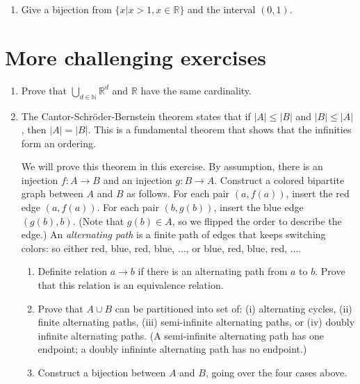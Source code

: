 \documentclass[11pt]{article}
\theoremstyle{definition}
\def\RR{\mathbb R}
\newcommand{\NN}{\mathbb{N}}
\begin{document}
\begin{enumerate}
    \item Give a bijection from $\{x | x > 1, x \in \RR\}$ and the interval $(0,1)$.
\end{enumerate}


\section{More challenging exercises}

\begin{enumerate}
    \item Prove that $\bigcup_{d \in \NN} \RR^d$ and $\RR$ have the same cardinality. 
    \item The Cantor-Schr\"{o}der-Bernstein theorem states that if $|A| \leq |B|$ and $|B| \leq |A|$, then $|A| = |B|$. This is a fundamental theorem
        that shows that the infinities form an ordering.

        We will prove this theorem in this exercise. By assumption, there is an injection $f: A \to B$ and an injection $g: B \to A$. Construct a colored bipartite graph between
        $A$ and $B$ as follows. For each pair $(a, f(a))$, insert the red edge $(a, f(a))$. For each pair $(b, g(b))$, insert
        the blue edge $(g(b), b)$. (Note that $g(b) \in A$, so we flipped the order to describe the edge.) An \emph{alternating path} is 
        a finite path of edges that keeps switching colors: so either red, blue, red, blue, $\ldots$, or blue, red, blue, red, $\ldots$.
        \begin{enumerate}
            \item Definite relation $a \to b$ if there is an alternating path from $a$ to $b$. Prove that this relation is an equivalence relation.
            \item Prove that $A \cup B$ can be partitioned into set of: (i) alternating cycles, (ii) finite alternating paths, (iii)
                semi-infinite alternating paths, or (iv) doubly infinite alternating paths. (A semi-infinite alternating path has one endpoint;
                a doubly infininte alternating path has no endpoint.)
            \item Construct a bijection between $A$ and $B$, going over the four cases above.
        \end{enumerate}
\end{enumerate}
\end{document}
